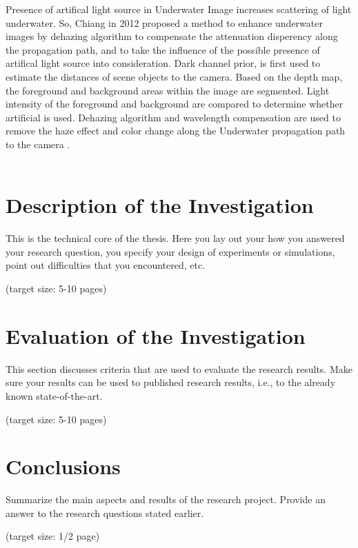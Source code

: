 \documentclass[a4paper,11pt,oneside]{article}
\begin{document}
  Presence of artifical light source in Underwater Image increases scattering of light underwater. So, Chiang in 2012 \cite{13} proposed a method to enhance underwater images by dehazing algorithm to compensate the attenuation disperency along the propagation path, and to take the influence of the possible presence of artifical light source into consideration. Dark channel prior, is first used to estimate the distances of scene objects to the camera. Based on the depth map, the foreground and background areas within the image are segmented. Light intensity of the foreground and background are compared to determine whether artificial is used. Dehazing algorithm and wavelength compensation are used to remove the haze effect and color change along the Underwater propagation path to the camera \cite{13}.\\
  \\
  
  
  \section{Description of the Investigation}
  \label{sec:3}
  This is the technical core of the thesis. Here you lay out your how
  you answered your research question, you specify your design of
  experiments or simulations, point out difficulties that you
  encountered, etc.

  (target size: 5-10 pages)
  
  \section{Evaluation of the Investigation}
  \label{sec:4}

  This section discusses criteria that are used to evaluate the
  research results. Make sure your results can be used to published
  research results, i.e., to the already known state-of-the-art.

  (target size: 5-10 pages)


\section{Conclusions}
\label{sec:5}

  Summarize the main aspects and results of the research
  project. Provide an answer to the research questions stated earlier.

  (target size: 1/2 page)
  
  \newpage
  
  \printbibliography
  
\end{document}

